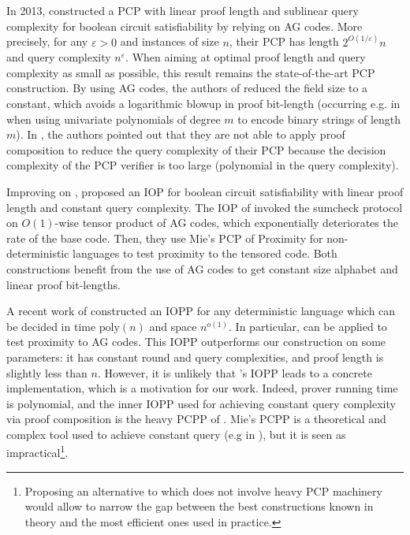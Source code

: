 \documentclass[a4paper,USenglish,autoref]{lipics-v2021}
\renewcommand\epsilon{\varepsilon}
\begin{document}
In 2013, \cite{BKKMS13} constructed a PCP with linear proof length and sublinear query complexity for boolean circuit satisfiability by relying on AG codes. More precisely, for any $\epsilon > 0$ and instances of size $n$, their PCP has length $2^{O(1/\epsilon)}n$ and query complexity $n^\epsilon$. When aiming at optimal proof length and query complexity as small as possible, this result remains the state-of-the-art PCP construction. By using AG codes, the authors of \cite{BKKMS13} reduced the field size to a constant, which avoids a logarithmic blowup in proof bit-length (occurring e.g. in \cite{BS08} when using univariate polynomials of degree $m$ to encode binary strings of length $m$). 
In \cite{BKKMS13}, the authors pointed out that they are not able to apply proof composition \cite{AS92} to reduce the query complexity of their PCP because the decision complexity of the PCP verifier is too large (polynomial in the query complexity). 

Improving on \cite{BKKMS13}, \cite{BCGRS17} proposed an IOP for boolean circuit satisfiability with linear proof length and constant query complexity. The IOP of \cite{BCGRS17} invoked the sumcheck protocol \cite{LFKN90} on $O(1)$-wise tensor product of AG codes, which exponentially deteriorates the rate of the base code. Then, they use Mie's PCP of Proximity for non-deterministic languages \cite{Mie09} to test proximity to the tensored code. Both constructions benefit from the use of AG codes to get constant size alphabet and linear proof bit-lengths. 

A recent work of \cite{RR20} constructed an IOPP for any deterministic language which can be decided in time $\text{poly}(n)$ and space $n^{o(1)}$. In particular, \cite[Corollary~3.6]{RR20} can be applied to test proximity to AG codes. This IOPP outperforms our construction on some parameters: it has constant round and query complexities, and proof length is slightly less than $n$. However, it is unlikely that \cite{RR20}'s IOPP leads to a concrete implementation, which is a motivation for our work. Indeed, prover running time is polynomial, and the inner IOPP used for achieving constant query complexity via proof composition is the heavy PCPP of \cite{Mie09}. Mie's PCPP is a theoretical and complex tool used to achieve constant query (e.g in \cite{BCGRS17,BCGGRS19,BCL20}), but it is seen as impractical\footnote{Proposing an alternative to \cite{Mie09} which does not involve heavy PCP machinery would allow to narrow the gap between the best constructions known in theory and the most efficient ones used in practice.}.
\end{document}
